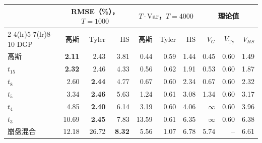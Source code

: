 \begin{tabular}{lrrrrrrrrr}
\toprule
 & \multicolumn{3}{c}{RMSE（\%），$T=1000$} & \multicolumn{3}{c}{$T\cdot\mathrm{Var}$，$T=4000$} & \multicolumn{3}{c}{理论值} \\
\cmidrule(lr){2-4}\cmidrule(lr){5-7}\cmidrule(lr){8-10}
DGP & 高斯 & Tyler & HS & 高斯 & Tyler & HS & $V_G$ & $V_{\mathrm{Ty}}$ & $V_{HS}$ \\
\midrule
高斯 & \textbf{2.11} & 2.43 & 3.81 & 0.44 & 0.59 & 1.44 & 0.45 & 0.60 & 1.49 \\
$t_{15}$ & \textbf{2.32} & 2.46 & 4.33 & 0.56 & 0.62 & 1.91 & 0.53 & 0.60 & 1.87 \\
$t_8$ & 2.60 & \textbf{2.44} & 4.77 & 0.67 & 0.60 & 2.34 & 0.67 & 0.60 & 2.32 \\
$t_5$ & 3.34 & \textbf{2.46} & 5.63 & 1.24 & 0.61 & 3.08 & 1.34 & 0.60 & 3.17 \\
$t_4$ & 4.85 & \textbf{2.40} & 6.14 & 3.19 & 0.60 & 4.06 & $\infty$ & 0.60 & 3.96 \\
$t_3$ & 10.69 & \textbf{2.45} & 7.83 & 13.59 & 0.61 & 6.35 & $\infty$ & 0.60 & 6.38 \\
崩盘混合 & 12.18 & 26.72 & \textbf{8.32} & 5.56 & 1.07 & 6.78 & 5.74 & -- & 6.61 \\
\bottomrule
\end{tabular}
